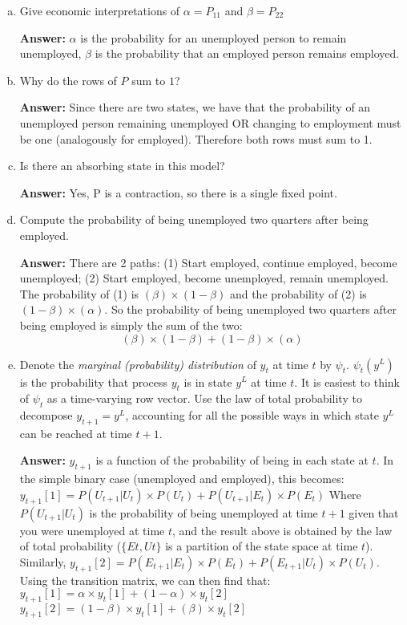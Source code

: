 \documentclass[11pt]{extarticle}
\theoremstyle{plain}
\theoremstyle{definition}
\begin{document}
\vspace{5mm}
\noindent
\begin{enumerate}[(a)]
\item Give economic interpretations of $\alpha = P_{11}$ and $\beta = P_{22}$

\textbf{Answer:} $\alpha$ is the probability for an unemployed person to remain unemployed, $\beta$ is the probability that an employed person remains employed.
\item Why do the rows of $P$ sum to $1$?

\textbf{Answer:} Since there are two states, we have that the probability of an unemployed person remaining unemployed OR changing to employment must be one (analogously for employed). Therefore both rows must sum to 1.
\item Is there an absorbing state in this model?

\textbf{Answer:} Yes, P is a contraction, so there is a single fixed point.
\item Compute the probability of being unemployed two quarters after being employed. 

\textbf{Answer:} There are 2 paths: (1) Start employed, continue employed, become unemployed; (2) Start employed, become unemployed, remain unemployed.\\
The probability of (1) is $(\beta)\times (1-\beta)$ and the probability of (2) is $(1-\beta)\times (\alpha)$. So the probability of being unemployed two quarters after being employed is simply the sum of the two: 
$$(\beta)\times (1-\beta) + (1-\beta)\times (\alpha)$$
\item Denote the \textit{marginal (probability) distribution} of $y_t$ at time $t$ by $\psi_t$. $\psi_t(y^L)$ is the probability that process $y_t$ is in state $y^L$ at time $t$. It is easiest to think of $\psi_t$ as a time-varying row vector. Use the law of total probability to decompose $y_{t+1} = y^L$, accounting for all the possible ways in which state $y^L$ can be reached at time $t+1$. 

\textbf{Answer:} $y_{t+1}$ is a function of the probability of being in each state at $t$. In the simple binary case (unemployed and employed), this becomes:
$y_{t+1}[1] = P(U_{t+1}|U_{t})\times P(U_{t}) + P(U_{t+1}|E_{t})\times P(E_{t})$
Where $P(U_{t+1}|U_{t})$ is the probability of being unemployed at time $t+1$ given that you were unemployed at time $t$, and the result above is obtained by the law of total probability ($\{E{t},U{t} \}$ is a partition of the state space at time $t$). Similarly,
$y_{t+1}[2] = P(E_{t+1}|E_{t})\times P(E_{t}) + P(E_{t+1}|U_{t})\times P(U_{t})$.\\
Using the transition matrix, we can then find that: 
$y_{t+1}[1] = \alpha \times y_{t}[1] + (1-\alpha) \times y_{t}[2]$
$y_{t+1}[2] = (1-\beta) \times y_{t}[1] + (\beta) \times y_{t}[2]$


\end{enumerate}
\end{document}

